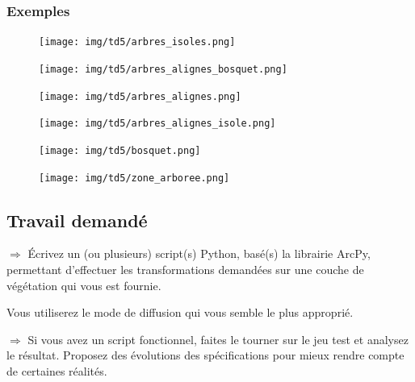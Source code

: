 \documentclass[11pt]{article}
\newcommand{\action}{$\Rightarrow$ }
\begin{document}
\subsubsection{Exemples}

\begin{figure}[H]
	\center \texttt{[image: img/td5/arbres\_isoles.png]}\\
\end{figure}

\vspace{2em}

\begin{figure}[H]
	\center \texttt{[image: img/td5/arbres\_alignes\_bosquet.png]}\\
\end{figure}

\vspace{2em}

\begin{figure}[H]
	\center \texttt{[image: img/td5/arbres\_alignes.png]}\\
\end{figure}

\vspace{2em}

\begin{figure}[H]
	\center \texttt{[image: img/td5/arbres\_alignes\_isole.png]}\\
\end{figure}

\vspace{2em}

\begin{figure}[H]
	\center \texttt{[image: img/td5/bosquet.png]}\\
\end{figure}

\vspace{2em}

\begin{figure}[H]
	\center \texttt{[image: img/td5/zone\_arboree.png]}\\
\end{figure}


\subsection{Travail demandé}

\action Écrivez un (ou plusieurs) script(s) Python, basé(s) la librairie ArcPy, permettant d'effectuer les transformations demandées sur une couche de végétation qui vous est fournie.

Vous utiliserez le mode de diffusion qui vous semble le plus approprié.


\action Si vous avez un script fonctionnel, faites le tourner sur le jeu test et analysez le résultat. Proposez des évolutions des spécifications pour mieux rendre compte de certaines réalités.
\end{document}
